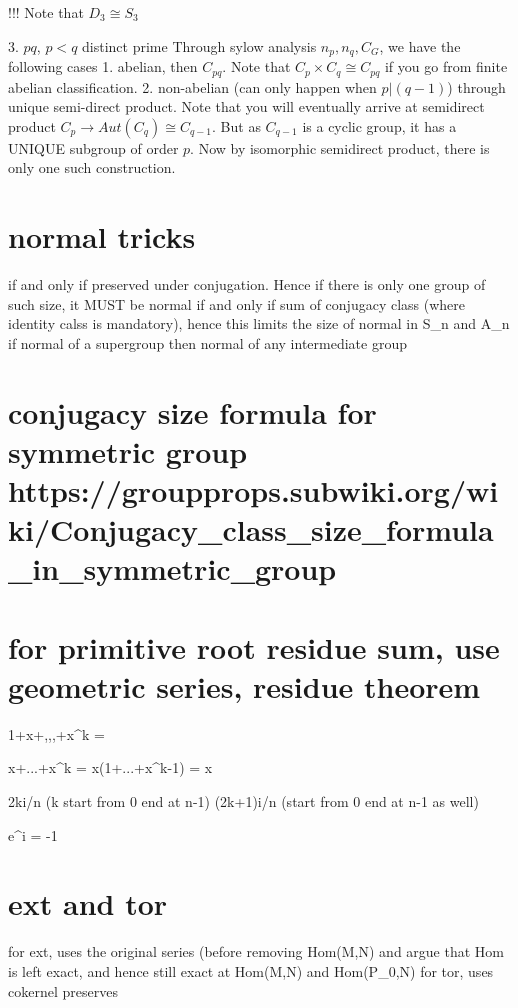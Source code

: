 {{	!!! Note that $D_3 \cong S_3$
    
3. $pq$, $p<q$ distinct prime
	 Through sylow analysis $n_p, n_q, C_G$, we have the following cases
     	1. abelian, then $C_{pq}$. Note that $C_p \times C_q \cong C_{pq}$ if you go from finite abelian classification.
        2. non-abelian (can only happen when $p | (q-1)$) through unique semi-direct product. Note that you will eventually arrive at semidirect product $C_p \to Aut(C_q) \cong C_{q-1}$. But as $C_{q-1}$ is a cyclic group, it has a UNIQUE subgroup of order $p$. Now by isomorphic semidirect product, there is only one such construction.



\section*{normal tricks}
    if and only if preserved under conjugation. Hence if there is only one group of such size, it MUST be normal
    if and only if sum of conjugacy class (where identity calss is mandatory), hence this limits the size of normal in S_n and A_n
    if normal of a supergroup then normal of any intermediate group

\section*{conjugacy size formula for symmetric group
https://groupprops.subwiki.org/wiki/Conjugacy_class_size_formula_in_symmetric_group}


\section*{for primitive root residue sum, use geometric series, residue theorem}
1+x+,,,+x^k = 

x+...+x^k = x(1+...+x^{k-1}) = x 

2k\pi i/n (k start from 0 end at n-1)
(2k+1)\pi i/n (start from 0  end at n-1 as well)

e^{i\pi} = -1



\section*{ext and tor}

for ext, uses the original series (before removing Hom(M,N) and argue that Hom is left exact, and hence still exact at Hom(M,N) and Hom(P_0,N)
for tor, uses cokernel preserves



}}

